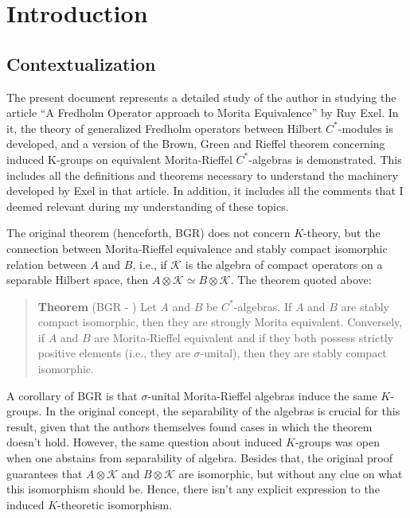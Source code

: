 \chapter*{Introduction}

\section*{Contextualization}

The present document represents a detailed study of the author in studying the article ``A Fredholm Operator approach to Morita Equivalence'' by Ruy Exel. In it, the theory of generalized Fredholm operators between Hilbert $C^*$-modules is developed, and a version of the Brown, Green and Rieffel theorem concerning induced K-groups on equivalent Morita-Rieffel $C^*$-algebras is demonstrated. This includes all the definitions and theorems necessary to understand the machinery developed by Exel in that article. In addition, it includes all the comments that I deemed relevant during my understanding of these topics.

The original theorem (henceforth, BGR) does not concern $K$-theory, but the connection between Morita-Rieffel equivalence and stably compact isomorphic relation between $A$ and $B$, i.e., if $\mathscr K$ is the algebra of compact operators on a separable Hilbert space, then $A\otimes \mathscr K \simeq B\otimes \mathscr K$. The theorem quoted above:
\begin{quote}
\textbf{Theorem} (BGR - \cite[Theorem 1.2]{brown1977morita}) 
Let $A$ and $B$ be $C^*$-algebras. If $A$ and $B$ are stably compact isomorphic, then they are strongly Morita equivalent. Conversely, if $A$ and $B$ are Morita-Rieffel equivalent and if they both possess strictly positive elements (i.e., they are $\sigma$-unital), then they are stably compact isomorphic.
\end{quote}
A corollary of BGR is that $\sigma$-unital Morita-Rieffel algebras induce the same $K$-groups. In the original concept, the separability of the algebras is crucial for this result, given that the authors themselves found cases in which the theorem doesn't hold. However, the same question about induced $K$-groups was open when one abstains from separability of algebra. Besides that, the original proof guarantees that $A\otimes \mathscr K$ and $B \otimes \mathscr K$ are isomorphic, but without any clue on what this isomorphism should be. Hence, there isn't any explicit expression to the induced $K$-theoretic isomorphism.

